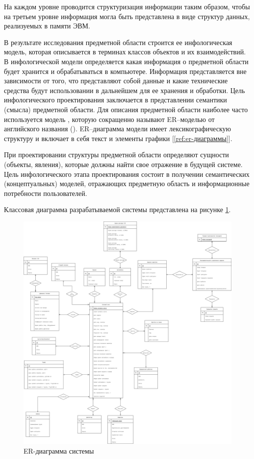 \documentclass[../nirs.tex]{subfiles}
\begin{document}
На каждом уровне проводится структуризация информации таким образом, чтобы на
третьем уровне информация могла быть представлена в виде структур данных,
реализуемых в памяти ЭВМ.

В результате исследования предметной области строится ее инфологическая модель,
которая описывается в терминах классов объектов и их взаимодействий. В
инфологической модели определяется какая информация о предметной области будет
хранится и обрабатываться в компьютере. Информация представляется вне
зависимости от того, что представляют собой данные и какие технические средства
будут использовании в дальнейшем для ее хранения и обработки. Цель инфологического
проектирования заключается в представлении семантики (смысла) предметной
области. Для описания предметной области наиболее часто используется модель
, которую сокращенно называют ER–моделью от
английского названия  (). ER–диаграмма модели имеет лексикографическую структуру и включает в
себя текст и элементы графики [\ref{ref:er-диаграммы}].

При проектировании структуры предметной области определяют сущности (объекты,
явления), которые должны найти свое отражение в будущей системе.
Цель инфологического этапа проектирования состоит в получении семантических
(концептуальных) моделей, отражающих предметную область и информационные
потребности пользователей.

Классовая диаграмма разрабатываемой системы представлена на рисунке
\ref{fig:2_1_3_er_diagram}.

\begin{figure}[hp!]
	\centering
	\includegraphics[keepaspectratio,width=\textwidth]{./images/2_1_3_er-diagram.png}
	\caption{ER-диаграмма системы}
	\label{fig:2_1_3_er_diagram}
\end{figure}
\end{document}
